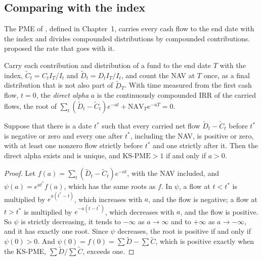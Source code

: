 \begin{chapterrefs}
\subsection{Comparing with the index}

The PME of \textcite{kaplan2005}, defined in Chapter~1, carries every cash flow to the end date with
the index and divides compounded distributions by compounded contributions. \textcite{gredil2023}
proposed the rate that goes with it.

\begin{definition}\label{def11:alpha}
Carry each contribution and distribution of a fund to the end date $T$ with the index,
$\tilde C_t=C_tI_T/I_t$ and $\tilde D_t=D_tI_T/I_t$, and count the NAV at $T$ once, as a final distribution
that is not also part of $\tilde D_T$. With time measured from the first cash flow, $t=0$, the
\emph{direct alpha} $a$ is the continuously compounded IRR of the carried flows, the root of
$\sum_t(\tilde D_t-\tilde C_t)e^{-at}+\mathrm{NAV}_Te^{-aT}=0$.
\end{definition}

\begin{proposition}\label{prop11:pme}
Suppose that there is a date $t^*$ such that every carried net flow $\tilde D_t-\tilde C_t$ before
$t^*$ is negative or zero and every one after $t^*$, including the NAV, is positive or zero, with at
least one nonzero flow strictly before $t^*$ and one strictly after it. Then the direct alpha exists and is unique, and $\mathrm{KS\text{-}PME}>1$ if and
only if $a>0$.
\end{proposition}

\begin{proof}
Let $f(a)=\sum_t(\tilde D_t-\tilde C_t)e^{-at}$, with the NAV included, and $\psi(a)=e^{at^*}f(a)$, which has
the same roots as $f$. In $\psi$, a flow at $t<t^*$ is multiplied by $e^{a(t^*-t)}$, which increases with
$a$, and the flow is negative; a flow at $t>t^*$ is multiplied by $e^{-a(t-t^*)}$, which decreases
with $a$, and the flow is positive. So $\psi$ is strictly decreasing, it tends to $-\infty$ as
$a\to\infty$ and to $+\infty$ as $a\to-\infty$, and it has exactly one root. Since $\psi$ decreases,
the root is positive if and only if $\psi(0)>0$. And $\psi(0)=f(0)=\sum\tilde D-\sum\tilde C$, which is
positive exactly when the KS-PME, $\sum\tilde D/\sum\tilde C$, exceeds one.
\end{proof}


\end{chapterrefs}
